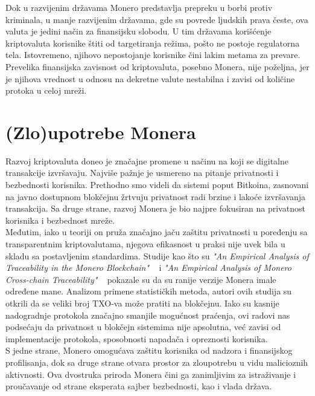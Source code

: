 \documentclass[12pt,a4paper]{article}
\begin{document}
Dok u razvijenim državama Monero predstavlja prepreku u borbi protiv kriminala, u manje razvijenim državama, gde su povrede ljudskih prava česte, ova valuta je jedini način za finansijsku slobodu. U tim državama korišćenje kriptovaluta korisnike štiti od targetiranja režima, pošto ne postoje regulatorna tela. Istovremeno, njihovo nepostojanje korisnike čini lakim metama za prevare. Prevelika finansijska zavisnost od kriptovaluta, posebno Monera, nije poželjna, jer je njihova vrednost u odnosu na dekretne valute nestabilna i zavisi od količine protoka u celoj mreži.


\newpage
\section{(Zlo)upotrebe Monera}
Razvoj kriptovaluta doneo je značajne promene u načinu na koji se digitalne transakcije izvršavaju. Najviše pažnje je usmereno na pitanje privatnosti i bezbednosti korisnika. Prethodno smo videli da sistemi poput Bitkoina, zasnovani na javno dostupnom blokčejnu žrtvuju privatnost radi brzine i lakoće izvršavanja transakcija. Sa druge strane, razvoj Monera je bio najpre fokusiran na privatnost korisnika i bezbednost mreže.\\ 

Međutim, iako u teoriji on pruža značajno jaču zaštitu privatnosti u poređenju sa transparentnim kriptovalutama, njegova efikasnost u praksi nije uvek bila u skladu sa postavljenim standardima. Studije kao što su \textit{"An Empirical Analysis of Traceability in the Monero Blockchain"} ~\cite{traceability} i \textit{"An Empirical Analysis of Monero Cross-chain  Traceability"} ~\cite{crosschain} pokazale su da su ranije verzije Monera imale određene mane. Analizom primene statističkih metoda, autori ovih studija su otkrili da se veliki broj TXO-va može pratiti na blokčejnu. Iako su kasnije nadogradnje protokola značajno smanjile mogućnost praćenja, ovi radovi nas podsećaju da privatnost u blokčejn sistemima nije apsolutna, već zavisi od implementacije protokola, sposobnosti napadača i opreznosti korisnika.\\

S jedne strane, Monero omogućava zaštitu korisnika od nadzora i finansijskog profilisanja, dok sa druge strane otvara prostor za zloupotrebu u vidu malicioznih aktivnosti. Ova dvostruka priroda Monera čini ga zanimljivim za istraživanje i proučavanje od strane eksperata sajber bezbednosti, kao i vlada država. 
\end{document}
